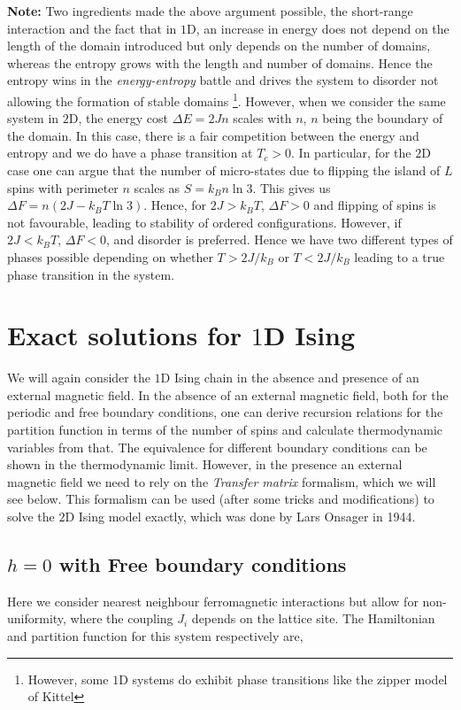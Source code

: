 \documentclass[11pt,a4paper]{article}
\begin{document}
\noindent \textbf{Note:} Two ingredients made the above argument possible, the short-range interaction and the fact that in $1$D, an increase in energy does not depend on the length of the domain introduced but only depends on the number of domains, whereas the entropy grows with the length and number of domains. Hence the entropy wins in the \emph{energy-entropy} battle and drives the system to disorder not allowing the formation of stable domains \footnote{However, some $1$D systems do exhibit phase transitions like the zipper model of Kittel}. However, when we consider the same system in $2$D, the energy cost $\Delta E = 2 J n$ scales with $n$, $n$ being the boundary of the domain. In this case, there is a fair competition between the energy and entropy and we do have a phase transition at $T_c > 0$. In particular, for the $2$D case one can argue that the number of micro-states due to flipping the island of $L$ spins with perimeter $n$ scales as $S = k_B n \ln 3$. This gives us $\Delta F = n \left(2 J - k_B T \ln 3 \right)$. Hence, for $2 J > k_B T$, $\Delta F > 0$ and flipping of spins is not favourable, leading to stability of ordered configurations. However, if $2 J < k_B T$, $\Delta F < 0$, and disorder is preferred. Hence we have two different types of phases possible depending on whether $T > 2 J / k_B$ or $T < 2 J / k_B$ leading to a true phase transition in the system. 


\section{Exact solutions for $1$D Ising}
We will again consider the $1$D Ising chain in the absence and presence of an external magnetic field. In the absence of an external magnetic field, both for the periodic and free boundary conditions, one can derive recursion relations for the partition function in terms of the number of spins and calculate thermodynamic variables from that. The equivalence for different boundary conditions can be shown in the thermodynamic limit. However, in the presence an external magnetic field we need to rely on the \emph{Transfer matrix} formalism, which we will see below. This formalism can be used (after some tricks and modifications) to solve the $2$D Ising model exactly, which was done by Lars Onsager in 1944. 

\subsection{$h=0$ with Free boundary conditions}
Here we consider nearest neighbour ferromagnetic interactions but allow for non-uniformity, where the coupling $J_i$ depends on the lattice site. The Hamiltonian and partition function for this system respectively are,
\end{document}
